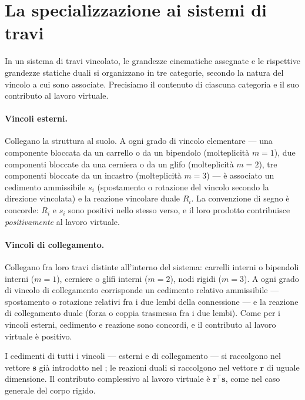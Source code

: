 \section{La specializzazione ai sistemi di travi}
\label{sec:TLV_travi_specializzazione}

In un sistema di travi vincolato, le grandezze cinematiche
assegnate e le rispettive grandezze statiche duali si
organizzano in tre categorie, secondo la natura del vincolo
a cui sono associate. Precisiamo il contenuto di ciascuna
categoria e il suo contributo al lavoro virtuale.


\paragraph{Vincoli esterni.}
Collegano la struttura al suolo. A ogni grado di vincolo
elementare --- una componente bloccata da un carrello o da
un bipendolo (molteplicità $m=1$), due componenti bloccate
da una cerniera o da un glifo (molteplicità $m=2$), tre
componenti bloccate da un incastro (molteplicità $m=3$) ---
è associato un cedimento ammissibile $s_i$ (spostamento o
rotazione del vincolo secondo la direzione vincolata) e la
reazione vincolare duale $R_i$. La convenzione di segno è
concorde: $R_i$ e $s_i$ sono positivi nello stesso verso,
e il loro prodotto contribuisce \emph{positivamente} al
lavoro virtuale.


\paragraph{Vincoli di collegamento.}
Collegano fra loro travi distinte all'interno del sistema:
carrelli interni o bipendoli interni ($m=1$), cerniere o
glifi interni ($m=2$), nodi rigidi ($m=3$). A ogni grado
di vincolo di collegamento corrisponde un cedimento
relativo ammissibile --- spostamento o rotazione relativi
fra i due lembi della connessione --- e la reazione di
collegamento duale (forza o coppia trasmessa fra i due
lembi). Come per i vincoli esterni, cedimento e reazione
sono concordi, e il contributo al lavoro virtuale è
positivo.

I cedimenti di tutti i vincoli --- esterni e di
collegamento --- si raccolgono nel vettore $\bm{s}$ già
introdotto nel ; le reazioni duali si
raccolgono nel vettore $\bm{r}$ di uguale dimensione. Il
contributo complessivo al lavoro virtuale è
$\bm{r}^\top\bm{s}$, come nel caso generale del corpo
rigido.


